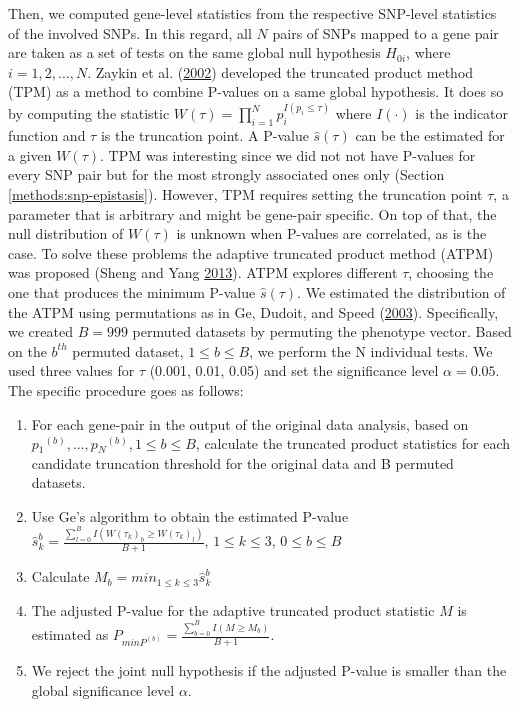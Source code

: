 \documentclass[
  11pt,
]{env/yjiao}
\begin{document}
Then, we computed gene-level statistics from the respective SNP-level
statistics of the involved SNPs. In this regard, all \(N\) pairs of SNPs
mapped to a gene pair are taken as a set of tests on the same global
null hypothesis \(H_{0i}\), where \(i=1,2,\dots ,N\). Zaykin et al. (\protect\hyperlink{ref-zaykin2002truncated}{2002})
developed the truncated product method (TPM) as a method to combine
P-values on a same global hypothesis. It does so by computing the
statistic \(W(\tau)=\prod_{i=1}^{N} p_i^{I(p_{i}\le\tau)}\) where
\(I(\cdot)\) is the indicator function and \(\tau\) is the truncation point.
A P-value \(\hat{s}(\tau)\) can be the estimated for a given \(W(\tau)\).
TPM was interesting since we did not not have
P-values for every SNP pair but for the most strongly associated ones
only (Section \ref{methods:snp-epistasis}). However, TPM requires setting the
truncation point \(\tau\), a parameter that is arbitrary and might be
gene-pair specific. On top of that, the null distribution of \(W(\tau)\)
is unknown when P-values are correlated, as is the case. To solve these
problems the adaptive truncated product method (ATPM) was proposed
(Sheng and Yang \protect\hyperlink{ref-sheng2013adaptive}{2013}). ATPM explores different \(\tau\), choosing the one
that produces the minimum P-value \(\hat{s}(\tau)\). We estimated the
distribution of the ATPM using permutations as in Ge, Dudoit, and Speed (\protect\hyperlink{ref-ge2003resampling}{2003}).
Specifically, we created \(B = 999\) permuted datasets by permuting the
phenotype vector. Based on the \(b^{th}\) permuted dataset,
\(1 \leq b \leq B\), we perform the N individual tests. We used three
values for \(\tau\) (0.001, 0.01, 0.05) and set the significance level
\(\alpha=0.05\). The specific procedure goes as follows:

\begin{enumerate}
\def\labelenumi{\arabic{enumi}.}
\item
  For each gene-pair in the output of the original data analysis,
  based on \(p{_1}^{(b)},...,p{_N}^{(b)},1\le b\le B\), calculate the
  truncated product statistics for each candidate truncation threshold
  for the original data and B permuted datasets.
\item
  Use Ge's algorithm to obtain the estimated P-value
  \(\hat{s}_{k}^{b}=\frac{\sum_{l=0}^B I(W(\tau_k)_b \geq W(\tau_k)_l)}{B+1}\),
  \(1 \le k \le 3\), \(0 \le b \le B\)
\item
  Calculate \(M{_b}=min_{1 \le k \le 3}\hat{s}_{k}^{b}\)
\item
  The adjusted P-value for the adaptive truncated product statistic
  \(M\) is estimated as
  \(P_{minP^{(b)}}=\frac{\sum_{b=0}^B I(M \geq M_b)}{B+1}\).
\item
  We reject the joint null hypothesis if the adjusted P-value is
  smaller than the global significance level \(\alpha\).
\end{enumerate}
\end{document}

